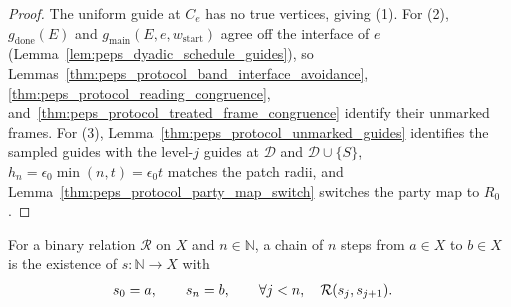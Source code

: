 \begin{proof}\leanok
    The uniform guide at $C_e$ has no true vertices, giving (1). For (2), $g_{\mathrm{done}}(E)$ and $g_{\mathrm{main}}(E,e,w_{\mathrm{start}})$ agree off the interface of $e$ (Lemma~\ref{lem:peps_dyadic_schedule_guides}), so Lemmas~\ref{thm:peps_protocol_band_interface_avoidance}, \ref{thm:peps_protocol_reading_congruence}, and~\ref{thm:peps_protocol_treated_frame_congruence} identify their unmarked frames. For (3), Lemma~\ref{thm:peps_protocol_unmarked_guides} identifies the sampled guides with the level-$j$ guides at $\mathcal D$ and $\mathcal D\cup\{S\}$, $h_n=\epsilon_0\min(n,t)=\epsilon_0t$ matches the patch radii, and Lemma~\ref{thm:peps_protocol_party_map_switch} switches the party map to $R_0$.
\end{proof}

\begin{definition}
    \label{def:peps_protocol_step_chain}
    \leanok
    For a binary relation $\mathcal R$ on $X$ and $n\in\mathbb N$, a chain of $n$ steps from $a\in X$ to $b\in X$ is the existence of $s\colon\mathbb N\to X$ with
    \begin{align}
        s_0 & = a,\qquad s_n=b,\qquad
        \forall j<n,\quad \mathcal R(s_j,s_{j+1}). \notag
    \end{align}
\end{definition}

